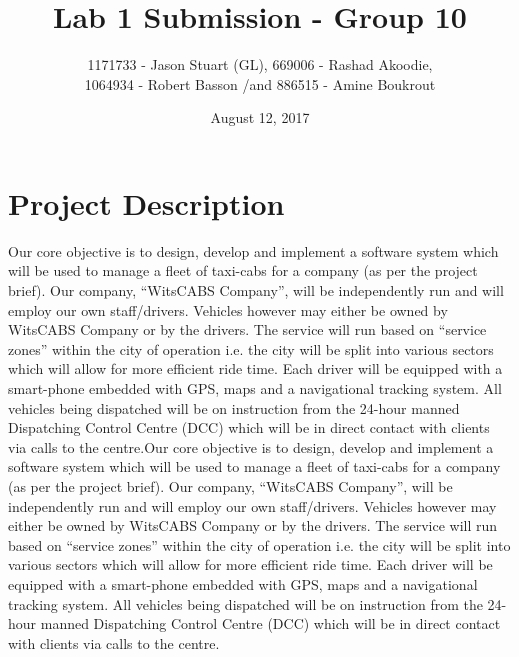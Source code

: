 \documentclass[a4paper,12pt]{article}
\begin{document}
\title{ Lab 1 Submission - Group 10}
\author{1171733 - Jason Stuart (GL), 669006 - Rashad Akoodie, \\1064934 - Robert Basson /and 886515 - Amine Boukrout}
\date{August 12, 2017}
\maketitle
\newpage
\tableofcontents
\newpage

\section{Project Description}
Our core objective is to design, develop and implement a software system which will be used to manage a fleet of taxi-cabs for a company (as per the project brief). Our company, “WitsCABS Company”, will be independently run and will employ our own staff/drivers. Vehicles however may either be owned by WitsCABS Company or by the drivers. The service will run based on “service zones” within the city of operation i.e. the city will be split into various sectors which will allow for more efficient ride time. Each driver will be equipped with a smart-phone embedded with GPS, maps and a navigational tracking system. All vehicles being dispatched will be on instruction from the 24-hour manned Dispatching Control Centre (DCC) which will be in direct contact with clients via calls to the centre.Our core objective is to design, develop and implement a software system which will be used to manage a fleet of taxi-cabs for a company (as per the project brief). Our company, “WitsCABS Company”, will be independently run and will employ our own staff/drivers. Vehicles however may either be owned by WitsCABS Company or by the drivers. The service will run based on “service zones” within the city of operation i.e. the city will be split into various sectors which will allow for more efficient ride time. Each driver will be equipped with a smart-phone embedded with GPS, maps and a navigational tracking system. All vehicles being dispatched will be on instruction from the 24-hour manned Dispatching Control Centre (DCC) which will be in direct contact with clients via calls to the centre.
\vskip 0.07in
\end{document}
